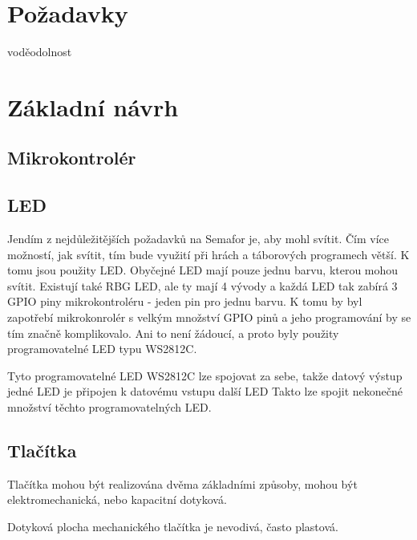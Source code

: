 \chapter{Požadavky}
voděodolnost


\chapter{Základní návrh}

\section{Mikrokontrolér}

\section{LED}
Jendím z nejdůležitějších požadavků na Semafor je, aby mohl svítit. Čím více možností, jak svítit, tím bude využití 
při hrách a táborových programech větší. K tomu jsou použity LED. Obyčejné LED mají pouze jednu barvu, kterou 
mohou svítit. Existují také RBG LED, ale ty mají 4 vývody a každá LED tak zabírá 3 GPIO piny mikrokontroléru - jeden pin
pro jednu barvu. K tomu by byl zapotřebí mikrokonrolér s velkým množství GPIO pinů a jeho programování by se tím značně 
komplikovalo. Ani to není žádoucí, a proto byly použity programovatelné LED typu WS2812C. %


Tyto programovatelné LED WS2812C lze spojovat za sebe, takže datový výstup jedné LED je připojen k datovému vstupu další LED %
Takto lze spojit nekonečné množství těchto programovatelných LED. 




\section{Tlačítka}
Tlačítka mohou být realizována dvěma základními způsoby, mohou být elektromechanická, nebo kapacitní dotyková. 

Dotyková plocha mechanického tlačítka je nevodivá, často plastová. 

